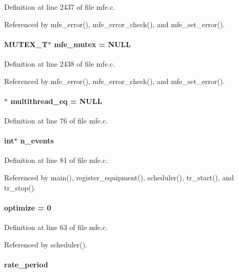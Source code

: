 Definition at line 2437 of file mfe.c.

Referenced by mfe\_\-error(), mfe\_\-error\_\-check(), and mfe\_\-set\_\-error().
\paragraph[{mfe\_\-mutex}]{\setlength{\rightskip}{0pt plus 5cm}MUTEX\_\-T$\ast$ {\bf mfe\_\-mutex} = NULL}\hfill\label{mfe_8c_a66752afa6ab28c1816463b7339592e3e}


Definition at line 2438 of file mfe.c.

Referenced by mfe\_\-error(), mfe\_\-error\_\-check(), and mfe\_\-set\_\-error().
\paragraph[{multithread\_\-eq}]{$\ast$ {\bf multithread\_\-eq} = NULL}\hfill\label{mfe_8c_a70168de725104e9390e949e6caa942ec}


Definition at line 76 of file mfe.c.
\paragraph[{n\_\-events}]{\setlength{\rightskip}{0pt plus 5cm}int$\ast$ {\bf n\_\-events}}\hfill\label{mfe_8c_a227a2ea01e3cfdb42d885e9314ca304e}


Definition at line 81 of file mfe.c.

Referenced by main(), register\_\-equipment(), scheduler(), tr\_\-start(), and tr\_\-stop().
\paragraph[{optimize}]{ {\bf optimize} = 0}\hfill\label{mfe_8c_a17033889b9f2e378c3bc26401a399550}


Definition at line 63 of file mfe.c.

Referenced by scheduler().
\paragraph[{rate\_\-period}]{ {\bf rate\_\-period}}\hfill\label{mfe_8c_a5a5eefb72c568f3c9c81d8c9c4b0dddc}


